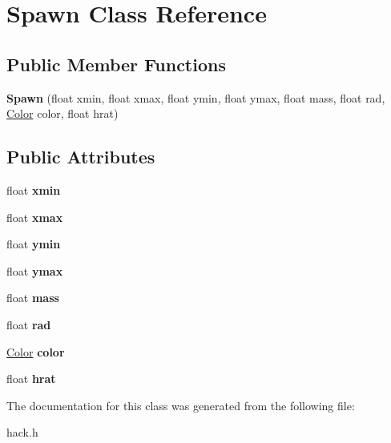 \hypertarget{class_spawn}{\section{Spawn Class Reference}
\label{class_spawn}
}
\subsection*{Public Member Functions}
\begin{DoxyCompactItemize}
\item 
\hypertarget{class_spawn_a195e12b95170a6c88d1e61b290a6678c}{{\bfseries Spawn} (float xmin, float xmax, float ymin, float ymax, float mass, float rad, \hyperlink{class_color}{Color} color, float hrat)}\label{class_spawn_a195e12b95170a6c88d1e61b290a6678c}

\end{DoxyCompactItemize}
\subsection*{Public Attributes}
\begin{DoxyCompactItemize}
\item 
\hypertarget{class_spawn_aeda64316c0a8ffca2da962cbd6e53de1}{float {\bfseries xmin}}\label{class_spawn_aeda64316c0a8ffca2da962cbd6e53de1}

\item 
\hypertarget{class_spawn_afd4c62cd67325dccfe7970bcb451409e}{float {\bfseries xmax}}\label{class_spawn_afd4c62cd67325dccfe7970bcb451409e}

\item 
\hypertarget{class_spawn_abcd0124e2b0d6b18f1240e1037b2d2ce}{float {\bfseries ymin}}\label{class_spawn_abcd0124e2b0d6b18f1240e1037b2d2ce}

\item 
\hypertarget{class_spawn_af3041b57a222968dcea6e0652d8e5c12}{float {\bfseries ymax}}\label{class_spawn_af3041b57a222968dcea6e0652d8e5c12}

\item 
\hypertarget{class_spawn_a228bf006bb6137fd632c238d9e876def}{float {\bfseries mass}}\label{class_spawn_a228bf006bb6137fd632c238d9e876def}

\item 
\hypertarget{class_spawn_a4521e63486a6cccbc110699c014ad95c}{float {\bfseries rad}}\label{class_spawn_a4521e63486a6cccbc110699c014ad95c}

\item 
\hypertarget{class_spawn_a1c3fca682e4a53b533a9c8b0b039b28a}{\hyperlink{class_color}{Color} {\bfseries color}}\label{class_spawn_a1c3fca682e4a53b533a9c8b0b039b28a}

\item 
\hypertarget{class_spawn_a02e45febfbb4ae0fc16f74395fc50018}{float {\bfseries hrat}}\label{class_spawn_a02e45febfbb4ae0fc16f74395fc50018}

\end{DoxyCompactItemize}


The documentation for this class was generated from the following file\-:\begin{DoxyCompactItemize}
\item 
hack.\-h\end{DoxyCompactItemize}
